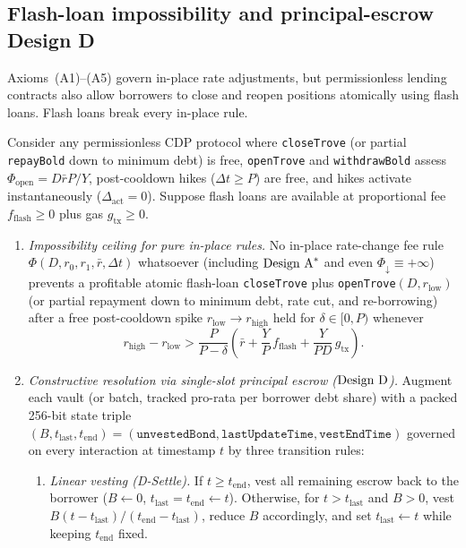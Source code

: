 \subsection{Flash-loan impossibility and principal-escrow Design D}\label{subsec:design_d}

Axioms~(A1)--(A5) govern in-place rate adjustments, but permissionless lending contracts also allow borrowers to close and reopen positions atomically using flash loans. Flash loans break every in-place rule.

\begin{theorem}\label{thm:flash}
Consider any permissionless CDP protocol where \texttt{closeTrove} (or partial \texttt{repayBold} down to minimum debt) is free, \texttt{openTrove} and \texttt{withdrawBold} assess $\Phi_{\mathrm{open}} = D\bar{r}P/Y$, post-cooldown hikes ($\Delta t \ge P$) are free, and hikes activate instantaneously ($\Delta_{\mathrm{act}} = 0$). Suppose flash loans are available at proportional fee $f_{\mathrm{flash}} \ge 0$ plus gas $g_{\mathrm{tx}} \ge 0$.
\begin{enumerate}[label=(\roman*), leftmargin=2.2em, itemsep=2pt]
\item \emph{Impossibility ceiling for pure in-place rules.} No in-place rate-change fee rule $\Phi(D, r_0, r_1, \bar{r}, \Delta t)$ whatsoever (including $\textup{Design A}^*$ and even $\Phi_\downarrow \equiv +\infty$) prevents a profitable atomic flash-loan \texttt{closeTrove} plus \texttt{openTrove}$(D, r_{\mathrm{low}})$ (or partial repayment down to minimum debt, rate cut, and re-borrowing) after a free post-cooldown spike $r_{\mathrm{low}} \to r_{\mathrm{high}}$ held for $\delta \in [0, P)$ whenever
\begin{equation}\label{eq:flash_imposs}
r_{\mathrm{high}} - r_{\mathrm{low}} > \frac{P}{P - \delta}\!\left(\bar{r} + \frac{Y}{P}\,f_{\mathrm{flash}} + \frac{Y}{P D}\,g_{\mathrm{tx}}\right).
\end{equation}
\item \emph{Constructive resolution via single-slot principal escrow ($\textup{Design D}$).} Augment each vault (or batch, tracked pro-rata per borrower debt share) with a packed 256-bit state triple $(B, t_{\mathrm{last}}, t_{\mathrm{end}}) = (\texttt{unvestedBond}, \texttt{lastUpdateTime}, \texttt{vestEndTime})$ governed on every interaction at timestamp $t$ by three transition rules:
\begin{enumerate}[label=(\alph*), leftmargin=1.8em, itemsep=2pt]
\item \emph{Linear vesting \textup{(D-Settle)}.} If $t \ge t_{\mathrm{end}}$, vest all remaining escrow back to the borrower ($B \leftarrow 0$, $t_{\mathrm{last}} = t_{\mathrm{end}} \leftarrow t$). Otherwise, for $t > t_{\mathrm{last}}$ and $B > 0$, vest $B(t - t_{\mathrm{last}})/(t_{\mathrm{end}} - t_{\mathrm{last}})$, reduce $B$ accordingly, and set $t_{\mathrm{last}} \leftarrow t$ while keeping $t_{\mathrm{end}}$ fixed.

\end{enumerate}
\end{enumerate}
\end{theorem}
